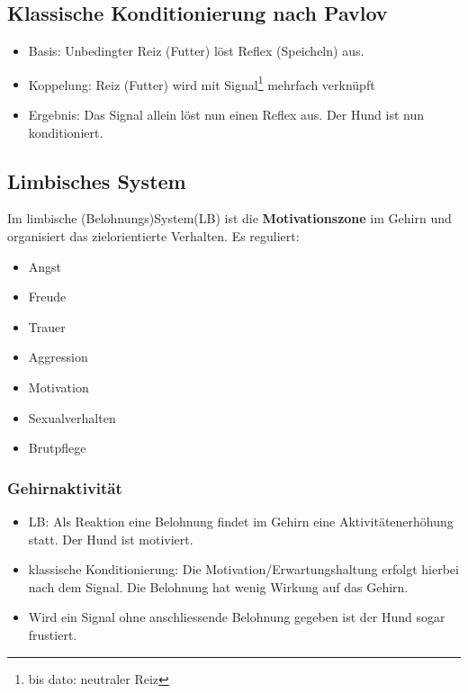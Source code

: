     \subsection{Klassische Konditionierung nach Pavlov}
        \begin{itemize}
            \item Basis: Unbedingter Reiz (Futter) löst Reflex (Speicheln) aus.
            \item Koppelung: Reiz (Futter) wird mit Signal\footnote{bis dato: neutraler Reiz} mehrfach verknüpft
            \item Ergebnis: Das Signal allein löst nun einen Reflex aus. Der Hund ist nun konditioniert.
        \end{itemize}

    \subsection{Limbisches System}
        Im limbische (Belohnungs)System(LB) ist die \textbf{Motivationszone} im Gehirn und organisiert das zielorientierte Verhalten. Es reguliert:
        \begin{itemize}
            \item Angst
            \item Freude
            \item Trauer
            \item Aggression
            \item Motivation
            \item Sexualverhalten
            \item Brutpflege
        \end{itemize}

        \subsubsection{Gehirnaktivität}
            \begin{itemize}
                \item LB: Als Reaktion eine Belohnung findet im Gehirn eine Aktivitätenerhöhung statt. Der Hund ist motiviert.
                \item klassische Konditionierung: Die Motivation/Erwartungshaltung erfolgt hierbei nach dem Signal. Die Belohnung hat wenig Wirkung auf das Gehirn.
                \item Wird ein Signal ohne anschliessende Belohnung gegeben ist der Hund sogar frustiert.
            \end{itemize}

